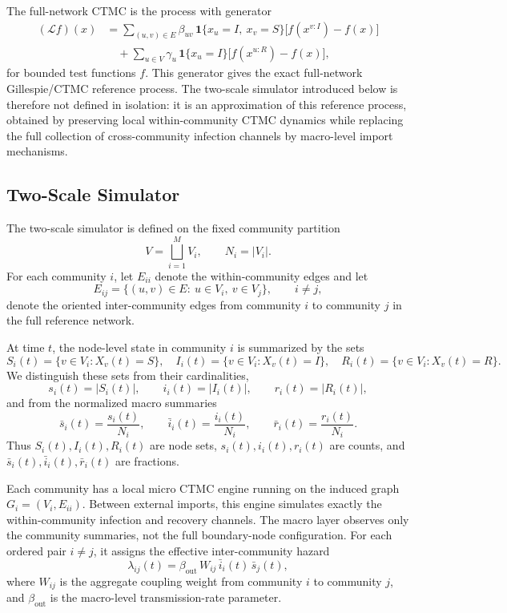 \documentclass[12pt]{article}
\begin{document}
The full-network CTMC is the process with generator
\[
\begin{aligned}
(\mathcal L f)(x)
&=
\sum_{(u,v)\in E}
\beta_{uv}\,\mathbf{1}\{x_u=I,\ x_v=S\}
\bigl[f(x^{v:I})-f(x)\bigr]
\\
&\quad+
\sum_{u\in V}
\gamma_u\,\mathbf{1}\{x_u=I\}
\bigl[f(x^{u:R})-f(x)\bigr],
\end{aligned}
\]
for bounded test functions \(f\). This generator gives the exact full-network Gillespie/CTMC reference process. The two-scale simulator introduced below is therefore not defined in isolation: it is an approximation of this reference process, obtained by preserving local within-community CTMC dynamics while replacing the full collection of cross-community infection channels by macro-level import mechanisms.

\subsection{Two-Scale Simulator}
\label{sec:two_scale_simulator}

The two-scale simulator is defined on the fixed community partition
\[
V=\bigsqcup_{i=1}^{M}V_i,
\qquad N_i=|V_i|.
\]
For each community \(i\), let \(E_{ii}\) denote the within-community edges and let
\[
E_{ij}=\{(u,v)\in E:\ u\in V_i,\ v\in V_j\},
\qquad i\neq j,
\]
denote the oriented inter-community edges from community \(i\) to community \(j\) in the full reference network.

At time \(t\), the node-level state in community \(i\) is summarized by the sets
\[
S_i(t)=\{v\in V_i:X_v(t)=S\},\quad
I_i(t)=\{v\in V_i:X_v(t)=I\},\quad
R_i(t)=\{v\in V_i:X_v(t)=R\}.
\]
We distinguish these sets from their cardinalities,
\[
s_i(t)=|S_i(t)|,\qquad i_i(t)=|I_i(t)|,\qquad r_i(t)=|R_i(t)|,
\]
and from the normalized macro summaries
\[
\bar{s}_i(t)=\frac{s_i(t)}{N_i},\qquad
\bar{i}_i(t)=\frac{i_i(t)}{N_i},\qquad
\bar{r}_i(t)=\frac{r_i(t)}{N_i}.
\]
Thus \(S_i(t),I_i(t),R_i(t)\) are node sets, \(s_i(t),i_i(t),r_i(t)\) are counts, and \(\bar{s}_i(t),\bar{i}_i(t),\bar{r}_i(t)\) are fractions.

Each community has a local micro CTMC engine running on the induced graph \(G_i=(V_i,E_{ii})\). Between external imports, this engine simulates exactly the within-community infection and recovery channels. The macro layer observes only the community summaries, not the full boundary-node configuration. For each ordered pair \(i\neq j\), it assigns the effective inter-community hazard
\[
\lambda_{ij}(t)
=\beta_{\mathrm{out}}\,W_{ij}\,\bar{i}_i(t)\,\bar{s}_j(t),
\]
where \(W_{ij}\) is the aggregate coupling weight from community \(i\) to community \(j\), and \(\beta_{\mathrm{out}}\) is the macro-level transmission-rate parameter.
\end{document}
